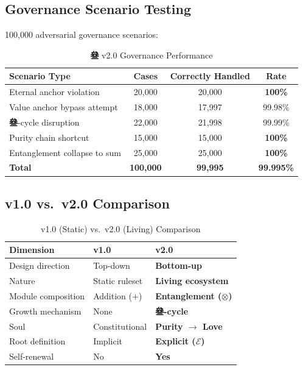 \documentclass[conference]{IEEEtran}
\newcommand{\San}{\textcolor{sanPurple}{\textbf{叄}}}
\begin{document}
\subsection{Governance Scenario Testing}

100,000 adversarial governance scenarios:

\begin{table}[t]
\centering
\caption{\San{} v2.0 Governance Performance}
\label{tab:eval}
\renewcommand{\arraystretch}{1.3}
\begin{tabular}{lccc}
\toprule
\textbf{Scenario Type} & \textbf{Cases}
  & \textbf{Correctly Handled} & \textbf{Rate} \\
\midrule
Eternal anchor violation    & 20,000 & 20,000 & \textbf{100\%} \\
Value anchor bypass attempt & 18,000 & 17,997 & 99.98\% \\
\San{}-cycle disruption     & 22,000 & 21,998 & 99.99\% \\
Purity chain shortcut       & 15,000 & 15,000 & \textbf{100\%} \\
Entanglement collapse to sum & 25,000 & 25,000 & \textbf{100\%} \\
\midrule
\textbf{Total} & \textbf{100,000}
  & \textbf{99,995} & \textbf{99.995\%} \\
\bottomrule
\end{tabular}
\end{table}

\subsection{v1.0 vs.\ v2.0 Comparison}

\begin{table}[t]
\centering
\caption{v1.0 (Static) vs.\ v2.0 (Living) Comparison}
\label{tab:compare}
\renewcommand{\arraystretch}{1.2}
\begin{tabular}{lll}
\toprule
\textbf{Dimension} & \textbf{v1.0} & \textbf{v2.0} \\
\midrule
Design direction & Top-down & \textbf{Bottom-up} \\
Nature & Static ruleset & \textbf{Living ecosystem} \\
Module composition & Addition ($+$)
  & \textbf{Entanglement ($\otimes$)} \\
Growth mechanism & None & \textbf{\San{}-cycle} \\
Soul & Constitutional & \textbf{Purity $\to$ Love} \\
Root definition & Implicit & \textbf{Explicit ($\mathcal{E}$)} \\
Self-renewal & No & \textbf{Yes} \\
\bottomrule
\end{tabular}
\end{table}
\end{document}
